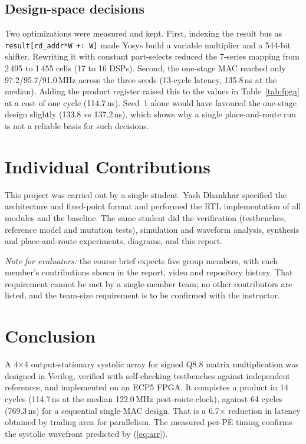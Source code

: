 \documentclass[conference]{IEEEtran}
\begin{document}
\subsection{Design-space decisions}
Two optimizations were measured and kept. First, indexing the result bus as \texttt{result[rd\_addr*W +: W]} made Yosys build a variable multiplier and a 544-bit shifter. Rewriting it with constant part-selects reduced the 7-series mapping from 2\,495 to 1\,455 cells (17 to 16 DSPs). Second, the one-stage MAC reached only 97.2/95.7/91.0\,MHz across the three seeds (13-cycle latency, 135.8\,ns at the median). Adding the product register raised this to the values in Table~\ref{tab:fpga} at a cost of one cycle (114.7\,ns). Seed~1 alone would have favoured the one-stage design slightly (133.8 vs 137.2\,ns), which shows why a single place-and-route run is not a reliable basis for such decisions.

\section{Individual Contributions}
This project was carried out by a single student. Yash Dhankhar specified the architecture and fixed-point format and performed the RTL implementation of all modules and the baseline. The same student did the verification (testbenches, reference model and mutation tests), simulation and waveform analysis, synthesis and place-and-route experiments, diagrams, and this report.

\emph{Note for evaluators:} the course brief expects five group members, with each member's contributions shown in the report, video and repository history. That requirement cannot be met by a single-member team; no other contributors are listed, and the team-size requirement is to be confirmed with the instructor.

\section{Conclusion}
A 4$\times$4 output-stationary systolic array for signed Q8.8 matrix multiplication was designed in Verilog, verified with self-checking testbenches against independent references, and implemented on an ECP5 FPGA. It completes a product in 14 cycles (114.7\,ns at the median 122.0\,MHz post-route clock), against 64 cycles (769.3\,ns) for a sequential single-MAC design. That is a 6.7$\times$ reduction in latency obtained by trading area for parallelism. The measured per-PE timing confirms the systolic wavefront predicted by (\ref{eq:arr}).
\end{document}
